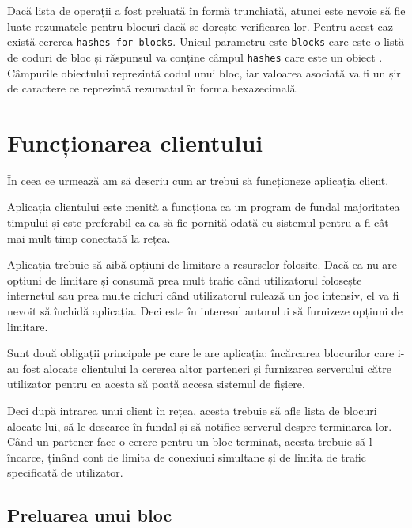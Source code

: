 \documentclass[a4wide,12pt]{report}
\newcommand{\cod}[1]{\texttt{#1}}
\newcommand{\acr}[1]{{\textsmaller[1]{\textsc{#1}}}} %
\begin{document}
Dacă lista de operații a fost preluată în formă trunchiată, atunci este nevoie să fie luate rezumatele pentru blocuri
dacă se dorește verificarea lor. Pentru acest caz există cererea \cod{hashes-for-blocks}. Unicul parametru este
\cod{blocks} care este o listă de coduri de bloc și răspunsul va conține câmpul \cod{hashes} care este un obiect
\acr{JSON}. Câmpurile obiectului reprezintă codul unui bloc, iar valoarea asociată va fi un șir de caractere ce
reprezintă rezumatul în forma hexazecimală.

\chapter{Funcționarea clientului}

În ceea ce urmează am să descriu cum ar trebui să funcționeze aplicația client.

Aplicația clientului este menită a funcționa ca un program de fundal majoritatea timpului și este preferabil ca ea să
fie pornită odată cu sistemul pentru a fi cât mai mult timp conectată la rețea.

Aplicația trebuie să aibă opțiuni de limitare a resurselor folosite. Dacă ea nu are opțiuni de limitare și consumă prea
mult trafic când utilizatorul folosește internetul sau prea multe cicluri \acr{UCP} când utilizatorul rulează un joc
intensiv, el va fi nevoit să închidă aplicația. Deci este în interesul autorului să furnizeze opțiuni de limitare.

Sunt două obligații principale pe care le are aplicația: încărcarea blocurilor care i-au fost alocate clientului la
cererea altor parteneri și furnizarea serverului \acr{FTP} către utilizator pentru ca acesta să poată accesa sistemul de
fișiere.

Deci după intrarea unui client în rețea, acesta trebuie să afle lista de blocuri alocate lui, să le descarce în fundal
și să notifice serverul despre terminarea lor. Când un partener face o cerere pentru un bloc terminat, acesta trebuie
să-l încarce, ținând cont de limita de conexiuni simultane și de limita de trafic specificată de utilizator.

\section{Preluarea unui bloc} %
\end{document}
